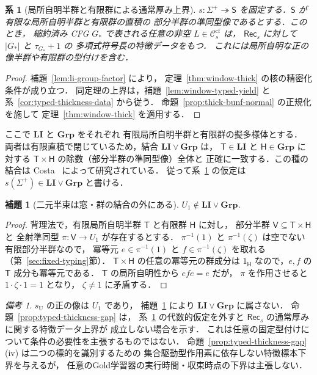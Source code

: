 \documentclass[11pt,a4paper]{ltjsarticle}
\newtheorem{lemma}[theorem]{補題}
\newtheorem{corollary}[theorem]{系}
\theoremstyle{remark}
\newtheorem{remark}[theorem]{備考}
\theoremstyle{plain}
\newcommand{\cf}{\mathrm{cf}}
\newcommand{\Ccf}[1]{\mathcal C_{#1}^{\cf}}
\begin{document}
\begin{corollary}[局所自明半群と有限群による通常厚み上界]
\label{cor:li-thickness}
$s:\Sigma^+\twoheadrightarrow\mathsf S$ を固定する．$\mathsf S$ が
有限な局所自明半群と有限群の直積の
部分半群の準同型像であるとする．このとき，
縮約済み CFG $G_*$ で表される任意の非空 $L\in\Ccf{s}$ は，
$\mathsf{Rec}_s$ に対して $|G_*|$ と $\tau_{G_*}+1$ の
多項式符号長の特徴データをもつ．
これには局所自明な正の像半群や有限群の型付けを含む．
\end{corollary}
\begin{proof}
補題~\ref{lem:li-group-factor} により，
定理~\ref{thm:window-thick} の核の精密化条件が成り立つ．
同定理の上界は，補題~\ref{lem:window-typed-yield} と
系~\ref{cor:typed-thickness-data} から従う．
命題~\ref{prop:thick-bunf-normal} の正規化を施して
定理~\ref{thm:window-thick} を適用する．

\end{proof}

ここで $\mathbf{LI}$ と $\mathbf{Grp}$ をそれぞれ
有限局所自明半群と有限群の擬多様体とする．
両者は有限直積で閉じているため，結合
$\mathbf{LI}\vee\mathbf{Grp}$ は，
$\mathsf T\in\mathbf{LI}$ と $\mathsf H\in\mathbf{Grp}$ に対する
$\mathsf T\times\mathsf H$ の除数（部分半群の準同型像）全体と
正確に一致する．この種の結合は
Costa~\cite{costa2002li,costa2002lig} によって研究されている．
従って系~\ref{cor:li-thickness} の仮定は
$s(\Sigma^+)\in\mathbf{LI}\vee\mathbf{Grp}$ と書ける．

\begin{lemma}[二元半束は窓・群の結合の外にある]
\label{lem:U1-outside}
$U_1\notin\mathbf{LI}\vee\mathbf{Grp}$.
\end{lemma}
\begin{proof}
背理法で，有限局所自明半群 $\mathsf T$ と有限群 $\mathsf H$ に対し，
部分半群 $\mathsf V\subseteq\mathsf T\times\mathsf H$ と
全射準同型 $\pi:\mathsf V\to U_1$ が存在するとする．
$\pi^{-1}(1)$ と $\pi^{-1}(\zeta)$ は空でない有限部分半群なので，
冪等元 $e\in\pi^{-1}(1)$ と $f\in\pi^{-1}(\zeta)$ を取れる
（第~\ref{sec:fixed-typing}節）．
$\mathsf T\times\mathsf H$ の任意の冪等元の群成分は
$1_{\mathsf H}$ なので，$e,f$ の $\mathsf T$ 成分も冪等元である．
$\mathsf T$ の局所自明性から $efe=e$ だが，
$\pi$ を作用させると $1\cdot\zeta\cdot1=1$ となり，
$\zeta\ne1$ に矛盾する．
\end{proof}

\begin{remark}
$s_{\mathrm U}$ の正の像は $U_1$ であり，
補題~\ref{lem:U1-outside} により
$\mathbf{LI}\vee\mathbf{Grp}$ に属さない．
命題~\ref{prop:typed-thickness-gap} は，
系~\ref{cor:li-thickness} の代数的仮定を外すと
$\mathsf{Rec}_s$ の通常厚みに関する特徴データ上界が
成立しない場合を示す．
これは任意の固定型付けについて条件の必要性を主張するものではない．
命題~\ref{prop:typed-thickness-gap}(iv) は二つの標的を識別するための
集合駆動型作用素に依存しない特徴標本下界を与えるが，
任意のGold学習器の実行時間・収束時点の下界は主張しない．
\end{remark}
\end{document}
